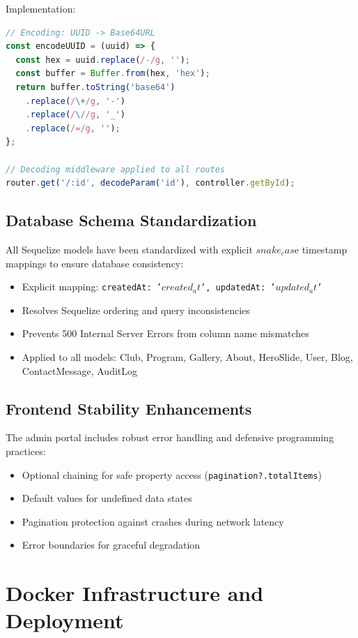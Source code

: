 \documentclass[12pt,a4paper]{article}
\begin{document}
Implementation:
\begin{lstlisting}[language=JavaScript]
// Encoding: UUID -> Base64URL
const encodeUUID = (uuid) => {
  const hex = uuid.replace(/-/g, '');
  const buffer = Buffer.from(hex, 'hex');
  return buffer.toString('base64')
    .replace(/\+/g, '-')
    .replace(/\//g, '_')
    .replace(/=/g, '');
};

// Decoding middleware applied to all routes
router.get('/:id', decodeParam('id'), controller.getById);
\end{lstlisting}

\subsection{Database Schema Standardization}
All Sequelize models have been standardized with explicit $snake_cas$e timestamp mappings to ensure database consistency:

\begin{itemize}
    \item Explicit mapping: \texttt{createdAt: '$created_at$', updatedAt: '$updated_at$'}
    \item Resolves Sequelize ordering and query inconsistencies
    \item Prevents 500 Internal Server Errors from column name mismatches
    \item Applied to all models: Club, Program, Gallery, About, HeroSlide, User, Blog, ContactMessage, AuditLog
\end{itemize}

\subsection{Frontend Stability Enhancements}
The admin portal includes robust error handling and defensive programming practices:

\begin{itemize}
    \item Optional chaining for safe property access (\texttt{pagination?.totalItems})
    \item Default values for undefined data states
    \item Pagination protection against crashes during network latency
    \item Error boundaries for graceful degradation
\end{itemize}

\section{Docker Infrastructure and Deployment}
\end{document}
